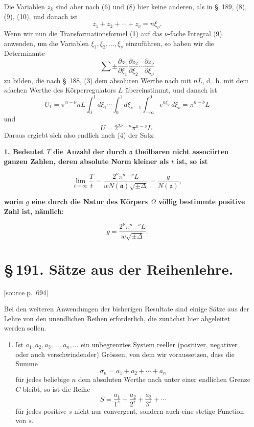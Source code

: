\documentclass[11pt]{article}
\newcommand{\srcpage}[1]{\par\medskip\noindent\textsf{[source p.~#1]}\par\smallskip}
\begin{document}
Die Variablen $z_k$ sind aber nach (6) und (8) hier keine anderen, als in \S~189, (8), (9), (10), und danach ist
\[
z_1+z_2+\cdots+z_\nu=n\xi_\nu.
\]
Wenn wir nun die Transformationsformel (1) auf das $\nu$-fache Integral (9) anwenden, um die Variablen $\xi_1,\xi_2,\ldots,\xi_\nu$ einzuführen, so haben wir die Determinante
\[
\sum\pm
\frac{\partial z_1}{\partial\xi_1}
\frac{\partial z_2}{\partial\xi_2}\cdots
\frac{\partial z_\nu}{\partial\xi_\nu}
\]
zu bilden, die nach \S~188, (3) dem absoluten Werthe nach mit $nL$, d.~h. mit dem $n$fachen Werthe des Körperregulators $L$ übereinstimmt, und danach ist
\[
U_1=\pi^{n-\nu}nL\int_0^1d\xi_1\cdots\int_0^1d\xi_{\nu-1}\int_{-\infty}^{0}e^{n\xi_\nu}\,d\xi_\nu
=\pi^{n-\nu}L
\]
und
\[
U=2^{2\nu-n}\pi^{n-\nu}L.
\]
Daraus ergiebt sich also endlich nach (4) der Satz:

\begin{center}
\textbf{1. Bedeutet $T$ die Anzahl der durch $\mathfrak a$ theilbaren nicht associirten ganzen Zahlen, deren absolute Norm kleiner als $t$ ist, so ist}
\end{center}
\begin{equation}
\lim_{t=\infty}\frac{T}{t}
=
\frac{2^\nu\pi^{n-\nu}L}{wN(\mathfrak a)\sqrt{\pm\Delta}}
=
\frac{g}{N(\mathfrak a)},
\tag{10}
\end{equation}
\begin{center}
\textbf{worin $g$ eine durch die Natur des Körpers $\Omega$ völlig bestimmte positive Zahl ist, nämlich:}
\end{center}
\begin{equation}
g=\frac{2^\nu\pi^{n-\nu}L}{w\sqrt{\pm\Delta}}.
\tag{11}
\end{equation}

\section*{\S\,191. Sätze aus der Reihenlehre.}

\srcpage{694}
Bei den weiteren Anwendungen der bisherigen Resultate sind einige Sätze aus der Lehre von den unendlichen Reihen erforderlich, die zunächst hier abgeleitet werden sollen.

\begin{enumerate}[label=\textbf{\arabic*.},leftmargin=2.2em]
\item Ist $a_1,a_2,a_3,\ldots,a_n,\ldots$ ein unbegrenztes System reeller (positiver, negativer oder auch verschwindender) Grössen, von dem wir voraussetzen, dass die Summe
\begin{equation}
\sigma_n=a_1+a_2+\cdots+a_n
\tag{1}
\end{equation}
für jedes beliebige $n$ dem absoluten Werthe nach unter einer endlichen Grenze $C$ bleibt, so ist die Reihe
\begin{equation}
S=\frac{a_1}{1^s}+\frac{a_2}{2^s}+\frac{a_3}{3^s}+\cdots
\tag{2}
\end{equation}
für jedes positive $s$ nicht nur convergent, sondern auch eine stetige Function von $s$.
\end{enumerate}
\end{document}
